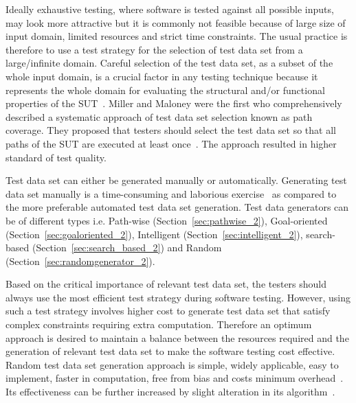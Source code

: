 Ideally exhaustive testing, where software is tested against all possible inputs, may look more attractive but it is commonly not feasible because of large size of input domain, limited resources and strict time constraints. The usual practice is therefore to use a test strategy for the selection of test data set from a large/infinite domain. Careful selection of the test data set, as a subset of the whole input domain, is a crucial factor in any testing technique because it represents the whole domain for evaluating the structural and/or functional properties of the SUT~\cite{howden1986functional, mccabe1983structured}. Miller and Maloney were the first who comprehensively described a systematic approach of test data set selection known as path coverage. They proposed that testers should select the test data set so that all paths of the SUT are executed at least once~\cite{miller1963systematic}. The approach resulted in higher standard of test quality. %

Test data set can either be generated manually or automatically. Generating test data set manually is a time-consuming and laborious exercise~\cite{korel1990automated} as compared to the more preferable automated test data set generation. Test data generators can be of different types i.e. Path-wise (Section~\ref{sec:pathwise_2}), Goal-oriented (Section~\ref{sec:goaloriented_2}), Intelligent (Section~\ref{sec:intelligent_2}), search-based (Section~\ref{sec:search_based_2}) and Random (Section~\ref{sec:randomgenerator_2}).

Based on the critical importance of relevant test data set, the testers should always use the most efficient test strategy during software testing. However, using such a test strategy involves higher cost to generate test data set that satisfy complex constraints requiring extra computation. Therefore an optimum approach is desired to maintain a balance between the resources required and the generation of relevant test data set to make the software testing cost effective. Random test data set generation approach is simple, widely applicable, easy to implement, faster in computation, free from bias and costs minimum overhead~\cite{ciupa2007experimental}. Its effectiveness can be further increased by slight alteration in its algorithm~\cite{chen2005adaptive}.



